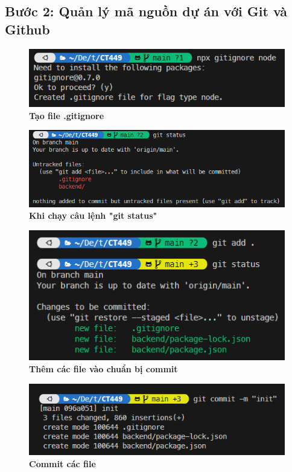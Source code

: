 \subsection*{Bước 2: Quản lý mã nguồn dự án với Git và Github}
\setcounter{subsection}{3}
\setcounter{figure}{0}
\begin{figure}[H]
  \centering
  \includegraphics{images/chapterFirst/4.png}
  \caption{\bfseries Tạo file .gitignore}
\end{figure}
\begin{figure}[H]
  \centering
  \includegraphics[width=15cm]{images/chapterFirst/5.png}
  \caption{\bfseries Khi chạy câu lệnh "git status"}
\end{figure}
\begin{figure}[H]
  \centering
  \includegraphics{images/chapterFirst/6.png}
  \caption{\bfseries Thêm các file vào chuẩn bị commit}
\end{figure}
\begin{figure}[H]
  \centering
  \includegraphics{images/chapterFirst/7.png}
  \caption{\bfseries Commit các file}
\end{figure}
